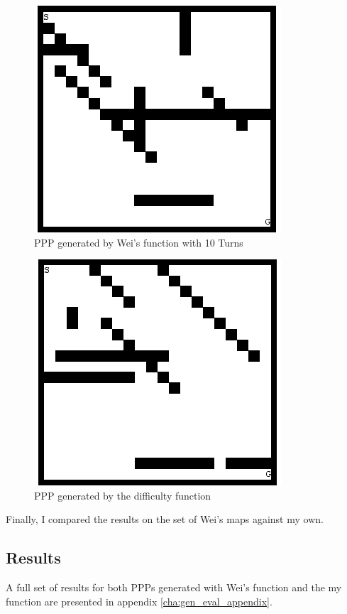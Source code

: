 \documentclass[authoryearcitations]{UoYCSproject}
\begin{document}
\begin{figure}
\graphicspath{ {EvalPics/} }
\includegraphics[scale=0.65]{wei_26.png}
\caption{PPP generated by Wei's function with 10 Turns}
\label{fig:wei_ppp}
\end{figure}

\begin{figure}
\graphicspath{ {EvalPics/} }
\includegraphics[scale=0.65]{openh_46.png}
\caption{PPP generated by the difficulty function}
\label{fig:difficulty_ppp}
\end{figure}

Finally, I compared the results on the set of Wei's maps against my own.

\subsection{Results}
\label{sec:gen_eval_results}

A full set of results for both PPPs generated with Wei's function and the my function are presented in appendix \ref{cha:gen_eval_appendix}.
\end{document}
